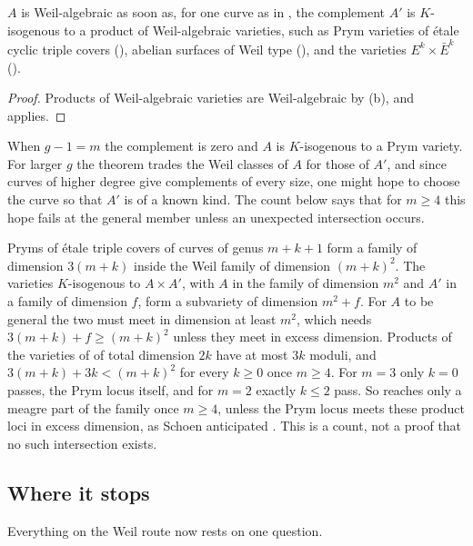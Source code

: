\begin{corollary}\label{cor:transfer}
$A$ is Weil-algebraic as soon as, for one curve as in ,
the complement $A'$ is $K$-isogenous to a product of Weil-algebraic
varieties, such as Prym varieties of \'etale cyclic triple covers
(), abelian surfaces of Weil type (), and
the varieties $E^{k}\times\bar E^{k}$ ().
\end{corollary}

\begin{proof}
Products of Weil-algebraic varieties are Weil-algebraic by
(b), and  applies.
\end{proof}

When $g-1=m$ the complement is zero and $A$ is $K$-isogenous to a Prym
variety. For larger $g$ the theorem trades the Weil classes of $A$ for those
of $A'$, and since curves of higher degree give complements of every size,
one might hope to choose the curve so that $A'$ is of a known kind. The
count below says that for $m\ge4$ this hope fails at the general member
unless an unexpected intersection occurs.

\begin{remark}\label{rem:count}
Pryms of \'etale triple covers of curves of genus $m+k+1$ form a family of
dimension $3(m+k)$ inside the Weil family of dimension $(m+k)^{2}$. The
varieties $K$-isogenous to $A\times A'$, with $A$ in the family of dimension
$m^{2}$ and $A'$ in a family of dimension $f$, form a subvariety of dimension
$m^{2}+f$. For $A$ to be general the two must meet in dimension at least
$m^{2}$, which needs $3(m+k)+f\ge(m+k)^{2}$ unless they meet in excess
dimension. Products of the varieties of  of total
dimension $2k$ have at most $3k$ moduli, and $3(m+k)+3k<(m+k)^{2}$ for every
$k\ge0$ once $m\ge4$. For $m=3$ only $k=0$ passes, the Prym locus itself, and
for $m=2$ exactly $k\le2$ pass. So  reaches only a meagre
part of the family once $m\ge4$, unless the Prym locus meets these product
loci in excess dimension, as Schoen anticipated \cite[\S3]{Sch88}. This is a
count, not a proof that no such intersection exists.
\end{remark}

\subsection{Where it stops}\label{ssec:whereitstops}
Everything on the Weil route now rests on one question.

